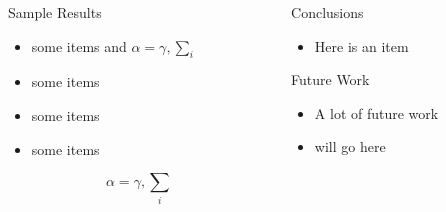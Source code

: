 \documentclass[final]{beamer}
\begin{document}
\begin{frame}{}
\begin{columns}[t]
\begin{column}{.32\linewidth}
        \begin{block}{Sample Results}
          \begin{itemize}
          \item some items and $\alpha=\gamma, \sum_{i}$
          \item some items
          \item some items
          \item some items
          \end{itemize}
          $$\alpha=\gamma, \sum_{i}$$
        \end{block}
      \end{column}
      \begin{column}{.32\linewidth}
        \begin{block}{Conclusions}
          \begin{itemize}
          \item Here is an item 
          \end{itemize}
        \end{block}
		\begin{block}{Future Work}
			\begin{itemize}
				\item A lot of future work
				\item will go here
			\end{itemize}
		\end{block}
      \end{column}
	  
    \end{columns}
\end{frame}
\end{document}
